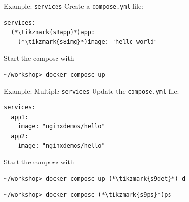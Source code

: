 \begin{frame}[fragile]{Example: \texttt{services}}
  Create a \texttt{compose.yml} file:
  \begin{yamlbox}
\begin{lstlisting}[style=wsyamlstyle]
services:
  (*\tikzmark{s8app}*)app:
    (*\tikzmark{s8img}*)image: "hello-world"
\end{lstlisting}
  \end{yamlbox}
  \medskip Start the compose with
  \begin{termbox}
\begin{lstlisting}[style=wstermstyle]
~/workshop> docker compose up
\end{lstlisting}
  \end{termbox}
\end{frame}

\begin{frame}[fragile]{Example: Multiple \texttt{services}}
  Update the \texttt{compose.yml} file:
  \begin{yamlbox}
\begin{lstlisting}[style=wsyamlstyle]
services:
  app1:
    image: "nginxdemos/hello"
  app2:
    image: "nginxdemos/hello"
\end{lstlisting}
  \end{yamlbox}
  \medskip Start the compose with
  \begin{termbox}
\begin{lstlisting}[style=wstermstyle]
~/workshop> docker compose up (*\tikzmark{s9det}*)-d
\end{lstlisting}
  \end{termbox}
  \smallskip
  \begin{termbox}
\begin{lstlisting}[style=wstermstyle]
~/workshop> docker compose (*\tikzmark{s9ps}*)ps
\end{lstlisting}
  \end{termbox}
\end{frame}

